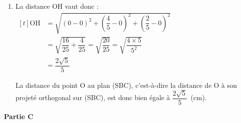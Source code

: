 \documentclass[10pt]{article}
\begin{document}
\begin{enumerate}
\begin{enumerate}
Donc H est le point de (OH) dont le paramètre fait que les coordonnées paramétriques vérifient l'équation de (SBC).

On résout donc : 
\quad $\begin{aligned}[t]
	4t+t-2= 0 & \iff 5t = 2\\
	& \iff t = \dfrac{2}{5}
	\end{aligned}$

H est donc le point de paramètre $t = \dfrac{2}{5}$ sur (OH),

donc ses coordonnées sont : \quad $\mathrm{H} \left(0 ~;~ \dfrac{4}{5} ~;~ \dfrac{2}{5}\right)$.

\item La distance OH vaut donc : \quad $\begin{aligned}[t]
	\mathrm{OH} &= \sqrt{(0-0)^2 + \left(\dfrac{4}{5}-0 \right)^2 + \left(\dfrac{2}{5} -0 \right)^2}\\
			& =\sqrt{\dfrac{16}{25} + \dfrac{4}{25}}=\sqrt{\dfrac{20}{25}}=\sqrt{\dfrac{4 \times 5}{5^2}}\\
			&=\dfrac{2\sqrt{5}}{5}
		\end{aligned}$

	La distance du point O au plan (SBC), c'est-à-dire la distance de O à son projeté orthogonal sur (SBC), est donc bien égale à $\dfrac{2 \sqrt{5}}{5}$~(cm).
		\end{enumerate}
	\end{enumerate}

\textbf{Partie C}
\end{document}
